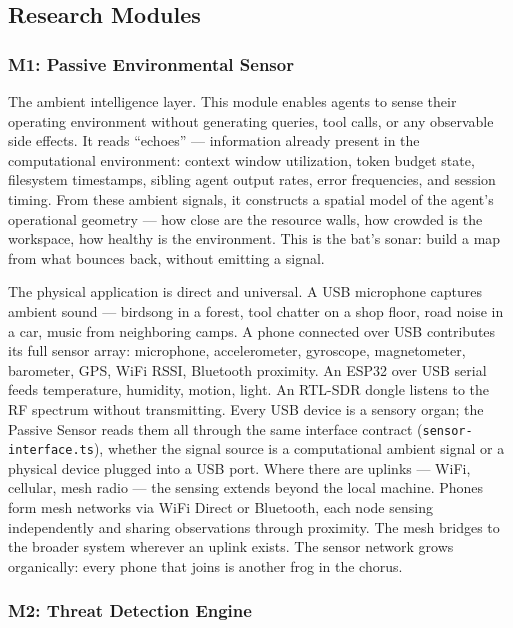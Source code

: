 \documentclass[11pt,letterpaper]{article}
\begin{document}
\subsection{Research Modules}

\subsubsection{M1: Passive Environmental Sensor}

The ambient intelligence layer. This module enables agents to sense their operating environment without generating queries, tool calls, or any observable side effects. It reads ``echoes'' --- information already present in the computational environment: context window utilization, token budget state, filesystem timestamps, sibling agent output rates, error frequencies, and session timing. From these ambient signals, it constructs a spatial model of the agent's operational geometry --- how close are the resource walls, how crowded is the workspace, how healthy is the environment. This is the bat's sonar: build a map from what bounces back, without emitting a signal.

The physical application is direct and universal. A USB microphone captures ambient sound --- birdsong in a forest, tool chatter on a shop floor, road noise in a car, music from neighboring camps. A phone connected over USB contributes its full sensor array: microphone, accelerometer, gyroscope, magnetometer, barometer, GPS, WiFi RSSI, Bluetooth proximity. An ESP32 over USB serial feeds temperature, humidity, motion, light. An RTL-SDR dongle listens to the RF spectrum without transmitting. Every USB device is a sensory organ; the Passive Sensor reads them all through the same interface contract (\texttt{sensor-interface.ts}), whether the signal source is a computational ambient signal or a physical device plugged into a USB port. Where there are uplinks --- WiFi, cellular, mesh radio --- the sensing extends beyond the local machine. Phones form mesh networks via WiFi Direct or Bluetooth, each node sensing independently and sharing observations through proximity. The mesh bridges to the broader system wherever an uplink exists. The sensor network grows organically: every phone that joins is another frog in the chorus.

\subsubsection{M2: Threat Detection Engine}
\end{document}
